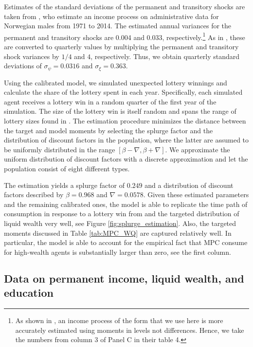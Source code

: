 \documentclass[\econtexRoot/HAFiscal]{subfiles}
\begin{document}
Estimates of the standard deviations of the permanent and transitory shocks are taken from \citet{crawley2024Parsimonious}, who estimate an income process on administrative data for Norwegian males from 1971 to 2014.
The estimated annual variances for the permanent and transitory shocks are 0.004 and 0.033, respectively.\footnote{As shown in \citet{crawley2024Parsimonious}, an income process of the form that we use here is more accurately estimated using moments in levels not differences.
Hence, we take the numbers from column 3 of Panel C in their table 4.} As in \citet{carroll2020sticky}, these are converted to quarterly values by multiplying the permanent and transitory shock variances by $1/4$ and $4$, respectively.
Thus, we obtain quarterly standard deviations of $\sigma_\psi=0.0316$ and $\sigma_\xi=0.363$.

Using the calibrated model, we simulated unexpected lottery winnings and calculate the share of the lottery spent in each year.
Specifically, each simulated agent receives a lottery win in a random quarter of the first year of the simulation.
The size of the lottery win is itself random and spans the range of lottery sizes found in \citet{fagereng_mpc_2021}.
The estimation procedure minimizes the distance between the target and model moments by selecting the splurge factor and the distribution of discount factors in the population, where the latter are assumed to be uniformly distributed in the range $[\beta-\nabla, \beta+\nabla]$.
We approximate the uniform distribution of discount factors with a discrete approximation and let the population consist of eight different types.

The estimation yields a splurge factor of $0.249$ and a distribution of discount factors described by $\beta = 0.968$ and $\nabla=0.0578$.
Given these estimated parameters and the remaining calibrated ones, the model is able to replicate the time path of consumption in response to a lottery win from \citet{fagereng_mpc_2021} and the targeted distribution of liquid wealth very well, see Figure \ref{fig:splurge_estimation}.
Also, the targeted moments discussed in Table \ref{tab:MPC_WQ} are captured relatively well.
In particular, the model is able to account for the empirical fact that MPC consume for high-wealth agents is substantially larger than zero, see the first column.




 

\hypertarget{data-on-permanent-income-liquid-wealth-and-education}{}\par\subsection{Data on permanent income, liquid wealth, and education}
\notinsubfile{\label{sec:SCFdata}}
\end{document}
